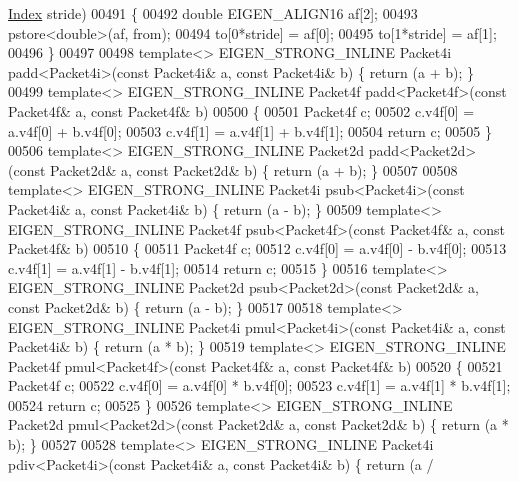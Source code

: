 \begin{DoxyCode}
{      \hyperlink{namespace_eigen_a62e77e0933482dafde8fe197d9a2cfde}{Index} stride)
00491 \{
00492   \textcolor{keywordtype}{double} EIGEN\_ALIGN16 af[2];
00493   pstore<double>(af, from);
00494   to[0*stride] = af[0];
00495   to[1*stride] = af[1];
00496 \}
00497 
00498 \textcolor{keyword}{template}<> EIGEN\_STRONG\_INLINE Packet4i padd<Packet4i>(\textcolor{keyword}{const} Packet4i& a, \textcolor{keyword}{const} Packet4i& b) \{ \textcolor{keywordflow}{return} (a + 
      b); \}
00499 \textcolor{keyword}{template}<> EIGEN\_STRONG\_INLINE Packet4f padd<Packet4f>(\textcolor{keyword}{const} Packet4f& a, \textcolor{keyword}{const} Packet4f& b)
00500 \{
00501   Packet4f c;
00502   c.v4f[0] = a.v4f[0] + b.v4f[0];
00503   c.v4f[1] = a.v4f[1] + b.v4f[1];
00504   \textcolor{keywordflow}{return} c;
00505 \}
00506 \textcolor{keyword}{template}<> EIGEN\_STRONG\_INLINE Packet2d padd<Packet2d>(\textcolor{keyword}{const} Packet2d& a, \textcolor{keyword}{const} Packet2d& b) \{ \textcolor{keywordflow}{return} (a + 
      b); \}
00507 
00508 \textcolor{keyword}{template}<> EIGEN\_STRONG\_INLINE Packet4i psub<Packet4i>(\textcolor{keyword}{const} Packet4i& a, \textcolor{keyword}{const} Packet4i& b) \{ \textcolor{keywordflow}{return} (a - 
      b); \}
00509 \textcolor{keyword}{template}<> EIGEN\_STRONG\_INLINE Packet4f psub<Packet4f>(\textcolor{keyword}{const} Packet4f& a, \textcolor{keyword}{const} Packet4f& b)
00510 \{
00511   Packet4f c;
00512   c.v4f[0] = a.v4f[0] - b.v4f[0];
00513   c.v4f[1] = a.v4f[1] - b.v4f[1];
00514   \textcolor{keywordflow}{return} c;
00515 \}
00516 \textcolor{keyword}{template}<> EIGEN\_STRONG\_INLINE Packet2d psub<Packet2d>(\textcolor{keyword}{const} Packet2d& a, \textcolor{keyword}{const} Packet2d& b) \{ \textcolor{keywordflow}{return} (a - 
      b); \}
00517 
00518 \textcolor{keyword}{template}<> EIGEN\_STRONG\_INLINE Packet4i pmul<Packet4i>(\textcolor{keyword}{const} Packet4i& a, \textcolor{keyword}{const} Packet4i& b) \{ \textcolor{keywordflow}{return} (a * 
      b); \}
00519 \textcolor{keyword}{template}<> EIGEN\_STRONG\_INLINE Packet4f pmul<Packet4f>(\textcolor{keyword}{const} Packet4f& a, \textcolor{keyword}{const} Packet4f& b)
00520 \{
00521   Packet4f c;
00522   c.v4f[0] = a.v4f[0] * b.v4f[0];
00523   c.v4f[1] = a.v4f[1] * b.v4f[1];
00524   \textcolor{keywordflow}{return} c;
00525 \}
00526 \textcolor{keyword}{template}<> EIGEN\_STRONG\_INLINE Packet2d pmul<Packet2d>(\textcolor{keyword}{const} Packet2d& a, \textcolor{keyword}{const} Packet2d& b) \{ \textcolor{keywordflow}{return} (a * 
      b); \}
00527 
00528 \textcolor{keyword}{template}<> EIGEN\_STRONG\_INLINE Packet4i pdiv<Packet4i>(\textcolor{keyword}{const} Packet4i& a, \textcolor{keyword}{const} Packet4i& b) \{ \textcolor{keywordflow}{return} (a / 
}
\end{DoxyCode}
